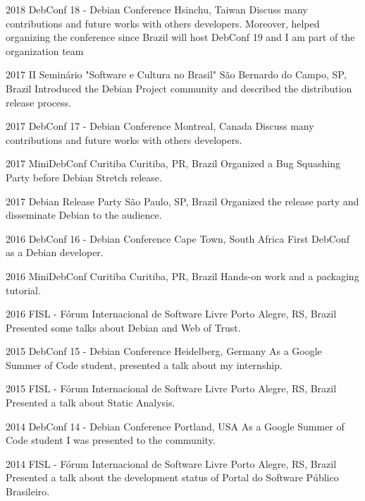 \documentclass[print]{friggeri-cv}
\begin{document}
\begin{entrylist}


\entry
{2018}
{DebConf 18 - Debian Conference}
{Hsinchu, Taiwan}
{Discuss many contributions and future works with others developers. Moreover,
helped organizing the conference since Brazil will host DebConf 19 and I am
part of the organization team}

\entry
{2017}
{II Seminário "Software e Cultura no Brasil"}
{São Bernardo do Campo, SP, Brazil}
{Introduced the Debian Project community and described the distribution release process.}

\entry
{2017}
{DebConf 17 - Debian Conference}
{Montreal, Canada}
{Discuss many contributions and future works with others developers.}

\entry
{2017}
{MiniDebConf Curitiba}
{Curitiba, PR, Brazil}
{Organized a Bug Squashing Party before Debian Stretch release.}

\entry
{2017}
{Debian Release Party}
{São Paulo, SP, Brazil}
{Organized the release party and disseminate Debian to the audience.}


\entry
{2016}
{DebConf 16 - Debian Conference}
{Cape Town, South Africa}
{First DebConf as a Debian developer.}

\entry
{2016}
{MiniDebConf Curitiba}
{Curitiba, PR, Brazil}
{Hands-on work and a packaging tutorial.}

\entry
{2016}
{FISL - Fórum Internacional de Software Livre}
{Porto Alegre, RS, Brazil}
{Presented some talks about Debian and Web of Trust.}


\entry
{2015}
{DebConf 15 - Debian Conference}
{Heidelberg, Germany}
{As a Google Summer of Code student, presented a talk about my internship.}

\entry
{2015}
{FISL - Fórum Internacional de Software Livre}
{Porto Alegre, RS, Brazil}
{Presented a talk about Static Analysis.}


\entry
{2014}
{DebConf 14 - Debian Conference}
{Portland, USA}
{As a Google Summer of Code student I was presented to the community.}

\entry
{2014}
{FISL - Fórum Internacional de Software Livre}
{Porto Alegre, RS, Brazil}
{Presented a talk about the development status of Portal do Software Público Brasileiro.}


\end{entrylist}
\end{document}
